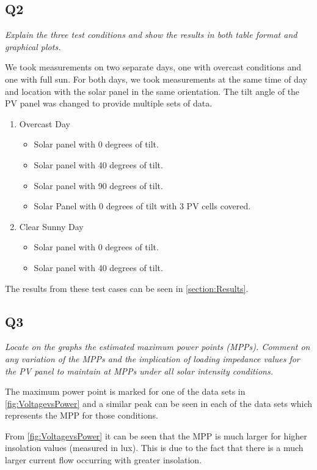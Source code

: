 \documentclass{article}
\begin{document}
	\newpage
	\subsection{Q2}
		\textit{Explain the three test conditions and show the results in both table format and graphical plots.}
		
		We took measurements on two separate days, one with overcast conditions and one with full sun. For both days, we took measurements at the same time of day and location with the solar panel in the same orientation. The tilt angle of the PV panel was changed to provide multiple sets of data.
		
		\begin{enumerate}
			\item Overcast Day
			\begin{itemize}
				\item Solar panel with 0 degrees of tilt.
				\item Solar panel with 40 degrees of tilt.
				\item Solar panel with 90 degrees of tilt.
				\item Solar Panel with 0 degrees of tilt with 3 PV cells covered.
			\end{itemize}
			\item Clear Sunny Day
			\begin{itemize}
				\item Solar panel with 0 degrees of tilt.
				\item Solar panel with 40 degrees of tilt.
			\end{itemize}
		\end{enumerate}	
	
	The results from these test cases can be seen in \cref{section:Results}. 
	
	\subsection{Q3}
		\textit{Locate on the graphs the estimated maximum power points (MPPs). Comment on any variation of the MPPs and the implication of loading impedance values for the PV panel to maintain at MPPs under all solar intensity conditions.}
		
		The maximum power point is marked for one of the data sets in \cref{fig:VoltagevsPower} and a similar peak can be seen in each of the data sets which represents the MPP for those conditions.
		
		From \cref{fig:VoltagevsPower} it can be seen that the MPP is much larger for higher insolation values (measured in lux). This is due to the fact that there is a much larger current flow occurring with greater insolation.
		
\end{document}
